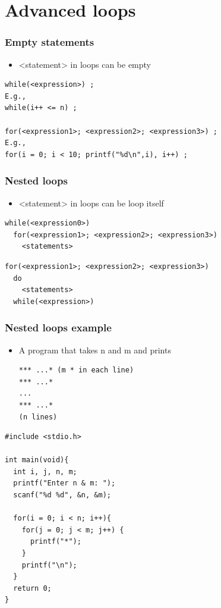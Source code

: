 \documentclass{../c-lecture}
\begin{document}
\section{Advanced loops}

\begin{frame}[fragile]
  \frametitle{Empty statements}
  \begin{itemize}
    \item <statement> in loops can be empty
  \end{itemize}
  \begin{verbatim}
while(<expression>) ;
E.g.,
while(i++ <= n) ;

for(<expression1>; <expression2>; <expression3>) ;
E.g.,
for(i = 0; i < 10; printf("%d\n",i), i++) ;
  \end{verbatim}
\end{frame}

\begin{frame}[fragile]
  \frametitle{Nested loops}
  \begin{itemize}
    \item <statement> in loops can be loop itself
  \end{itemize}
  \begin{verbatim}
while(<expression0>)
  for(<expression1>; <expression2>; <expression3>)
    <statements>
  \end{verbatim}
  \begin{verbatim}
for(<expression1>; <expression2>; <expression3>)
  do
    <statements>
  while(<expression>)
  \end{verbatim}
\end{frame}

\begin{frame}[fragile]
  \frametitle{Nested loops example}
  \begin{itemize}
    \item A program that takes n and m and prints
    \begin{verbatim}
*** ...* (m * in each line)
*** ...*
...
*** ...*
(n lines)
    \end{verbatim}
  \end{itemize}
\end{frame}

\begin{frame}[fragile]
  \begin{verbatim}
#include <stdio.h>

int main(void){
  int i, j, n, m;
  printf("Enter n & m: ");
  scanf("%d %d", &n, &m);

  for(i = 0; i < n; i++){
    for(j = 0; j < m; j++) {
      printf("*");
    }
    printf("\n");
  }
  return 0;
}
  \end{verbatim}
\end{frame}
\end{document}
